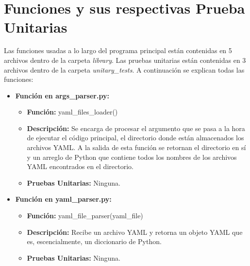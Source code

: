 \documentclass[a4paper]{article}
\begin{document}
\section{Funciones y sus respectivas Prueba Unitarias}
Las funciones usadas a lo largo del programa principal est\'{a}n contenidas en 5 archivos dentro de la carpeta \textit{library}. Las pruebas unitarias est\'{a}n contenidas en 3 archivos dentro de la carpeta \textit{unitary\_tests}. A continuaci\'{o}n se explican todas las funciones:

\begin{itemize}
    \item \textbf{Funci\'{o}n en args\_parser.py:}
        \begin{itemize}
            \item \textbf{Funci\'{o}n:} yaml\_files\_loader()
            \item \textbf{Descripci\'{o}n:} Se encarga de procesar el argumento que se pasa a la hora de ejecutar el c\'{o}digo principal, el directorio donde est\'{a}n almacenados los archivos YAML. A la salida de esta funci\'{o}n se retornan el directorio en s\'{i} y un arreglo de Python que contiene todos los nombres de los archivos YAML encontrados en el directorio.
            \item \textbf{Pruebas Unitarias:} Ninguna.
        \end{itemize}

    \item \textbf{Funci\'{o}n en yaml\_parser.py:}
        \begin{itemize}
            \item \textbf{Funci\'{o}n:} yaml\_file\_parser(yaml\_file)
            \item \textbf{Descripci\'{o}n:} Recibe un archivo YAML y retorna un objeto YAML que es, escencialmente, un diccionario de Python.
            \item \textbf{Pruebas Unitarias:} Ninguna.
        \end{itemize}
        

\end{itemize}
\end{document}
